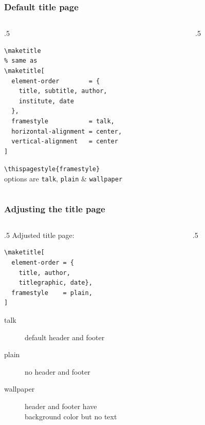 \documentclass{ltx-talk}
\newcommand{\cs}[1]{\texttt{\textbackslash #1}}
\newcommand{\tubbraced}[1]{\texttt{\{#1\}}}
\begin{document}
\begin{frame*}
\frametitle{Default title page}
\begin{columns}
\begin{column}{.5\textwidth}
\begin{lstlisting}
\maketitle
% same as
\maketitle[
  element-order        = {
    title, subtitle, author,
    institute, date
  },
  framestyle           = talk,
  horizontal-alignment = center,
  vertical-alignment   = center
]
\end{lstlisting}
\cs{thispagestyle}\tubbraced{framestyle}\\
options are \texttt{talk}, \texttt{plain} \& \texttt{wallpaper}
\end{column}
\begin{column}{.5\textwidth}
\maketitle
\end{column}
\end{columns}
\end{frame*}

\begin{frame*}
\frametitle{Adjusting the title page}
\begin{columns}
\begin{column}{.5\textwidth}
Adjusted title page:
\begin{lstlisting}
\maketitle[
  element-order = {
    title, author,
    titlegraphic, date},
  framestyle    = plain,
]
\end{lstlisting}
\begin{description}
\item[talk] default header and footer
\item[plain] no header and footer
\item[wallpaper] header and footer have\\
 background color but no text
\end{description}
\end{column}
\begin{column}{.5\textwidth}
\maketitle[
  element-order = {title, author, titlegraphic, date},
  framestyle = plain,
]
\end{column}
\end{columns}
\end{frame*}
\end{document}
